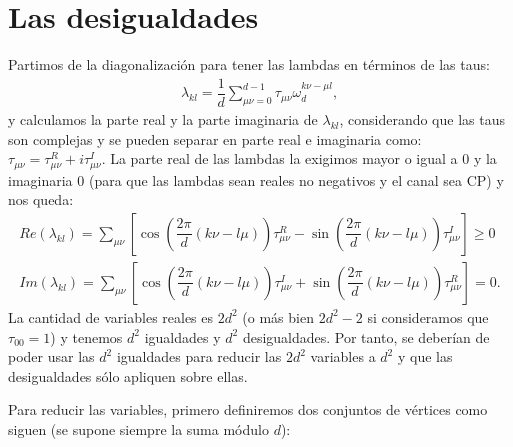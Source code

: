 \begin{figure}
    \qquad
\end{figure}
\newpage

\section{Las desigualdades}
Partimos de la diagonalización para tener las lambdas en términos de las taus:
\begin{align*}
\lambda_{kl} = \dfrac{1}{d} \sum_{\mu\nu=0}^{d-1} \tau_{\mu\nu} \omega_d^{k\nu - \mu l},
\end{align*}
y calculamos la parte real y la parte imaginaria de $\lambda_{kl}$,
considerando que las taus son complejas y se pueden separar en 
parte real e imaginaria como: $\tau_{\mu\nu} = \tau_{\mu\nu}^R + i \tau_{\mu\nu}^I$. 
La parte real de las lambdas la exigimos mayor o igual a $0$
 y la imaginaria 0 (para que las lambdas sean reales no negativos 
y el canal sea CP) y nos queda:
\begin{align}
Re(\lambda_{kl}) =  \sum_{\mu \nu} \left[ \cos \left( \dfrac{2\pi}{d}(k\nu-l\mu) \right) \tau_{\mu \nu}^R -\sin \left( \dfrac{2\pi}{d}(k\nu-l\mu) \right) \tau_{\mu \nu}^I \right] \geq 0 \label{desigualdades} \\
Im(\lambda_{kl}) = \sum_{\mu \nu} \left[ \cos \left( \dfrac{2\pi}{d}(k\nu-l\mu) \right) \tau_{\mu \nu}^I +\sin \left( \dfrac{2\pi}{d}(k\nu-l\mu) \right) \tau_{\mu \nu}^R \right] = 0.  \label{igualdades}
\end{align}
La cantidad de variables reales es $2d^2$ 
(o más bien $2d^2 - 2$ si consideramos que $\tau_{00} = 1$) y tenemos $d^2$ igualdades
y $d^2$ desigualdades. Por tanto, se deberían de poder usar las $d^2$ 
igualdades para reducir las $2d^2$
variables a $d^2$ y que las desigualdades sólo apliquen sobre ellas.

Para reducir las variables, primero definiremos dos conjuntos de vértices como siguen (se supone siempre la suma módulo $d$):

